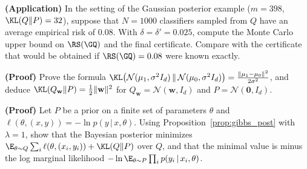 \begin{exercises}
\begin{exercise}
\textbf{(Application)} In the setting of the Gaussian posterior example ($m=398$,
$\KL(Q\|P)=32$), suppose that $N=1000$ classifiers sampled from $Q$ have an average
empirical risk of $0.08$. With $\delta=\delta'=0.025$, compute the Monte Carlo upper bound on
$\RS(\GQ)$ and the final certificate. Compare with the certificate that would be obtained
if $\RS(\GQ)=0.08$ were known exactly.
\end{exercise}
\begin{exercise}
\textbf{(Proof)} Prove the formula
$\KL\big(\mathcal N(\mu_1,\sigma^2 I_d)\,\|\,\mathcal N(\mu_0,\sigma^2 I_d)\big)=\frac{\|\mu_1-\mu_0\|^2}{2\sigma^2}$,
and deduce $\KL(Q_{\mathbf w}\|P)=\frac12\|\mathbf w\|^2$ for $Q_{\mathbf w}=\mathcal N(\mathbf w,I_d)$ and
$P=\mathcal N(\mathbf 0,I_d)$.
\end{exercise}
\begin{exercise}
\textbf{(Proof)} Let $P$ be a prior on a finite set of parameters $\theta$ and
$\ell(\theta,(x,y))=-\ln p(y\,|\,x,\theta)$. Using Proposition~\ref{prop:gibbs_post} with $\lambda=1$,
show that the Bayesian posterior minimizes $\E_{\theta\sim Q}\sum_i\ell(\theta,(x_i,y_i))+\KL(Q\|P)$
over $Q$, and that the minimal value is minus the log marginal likelihood
$-\ln\E_{\theta\sim P}\prod_ip(y_i\,|\,x_i,\theta)$.
\end{exercise}
\end{exercises}

